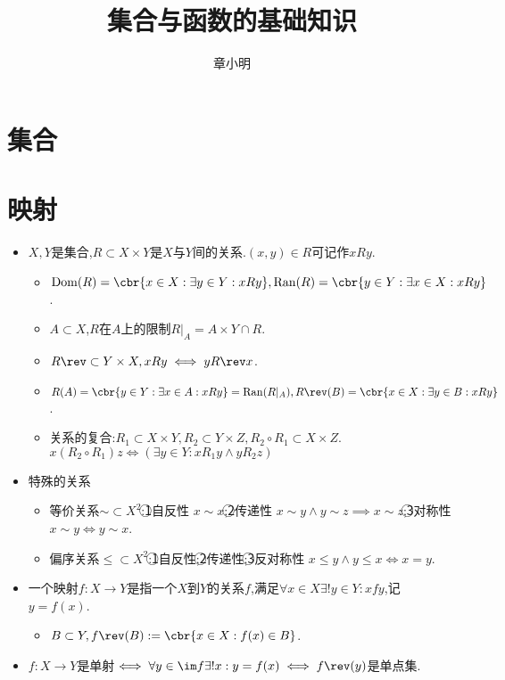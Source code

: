 \documentclass{article}
\title{集合与函数的基础知识}
\author{章小明}
\begin{document}
\maketitle
\section{集合}
\section{映射}
\begin{itemize}
    \item $X,Y$是集合,$R\subset X\times Y$是$X$与$Y$间的关系.$(x,y)\in R$可记作$xRy$.
    \begin{itemize}
        \item $\mathrm{Dom}(R)=\cbr{x\in X:\exists y\in Y:xRy},\mathrm{Ran}(R)=\cbr{y\in Y:\exists x\in X:xRy}$.
        \item $A\subset X$,$R$在$A$上的限制$R|_A=A\times Y\cap R$.
        \item $R\rev\subset Y\times X, xRy\iff yR\rev x$.
        \item $R(A)=\cbr{y\in Y:\exists x\in A:xRy}=\mathrm{Ran}(R|_A),R\rev(B)=\cbr{x\in X:\exists y\in B:xRy}$.
        \item 关系的复合:$R_1\subset X\times Y,R_2\subset Y\times Z, R_2\circ R_1\subset X\times Z$.$x(R_2\circ R_1)z\iff (\exists y\in Y: xR_1y\land yR_2z)$
    \end{itemize}
    \item 特殊的关系\begin{itemize}
        \item 等价关系$\sim \subset X^2$:\textcircled{1}自反性 $x\sim x$;\textcircled{2}传递性 $x\sim y\land y\sim z\implies x\sim z$;\textcircled{3}对称性 $x\sim y\iff y\sim x$.
        \item 偏序关系$\leq\subset X^2$:\textcircled{1}自反性;\textcircled{2}传递性;\textcircled{3}反对称性 $x\leq y\land y\leq x\iff x=y$.
    \end{itemize}
    \item 一个映射$f:X\to Y$是指一个$X$到$Y$的关系$f$,满足$\forall x\in X\exists! y\in Y: xfy$,记$y=f(x)$.
    \begin{itemize}
        \item $B\subset Y, f\rev(B):=\cbr{x\in X:f(x)\in B}$.
    \end{itemize}
    \item $f:X\to Y$是单射$\iff \forall y\in \im f \exists! x:y=f(x) \iff f\rev(y)$是单点集.\\

\end{itemize}
\end{document}
